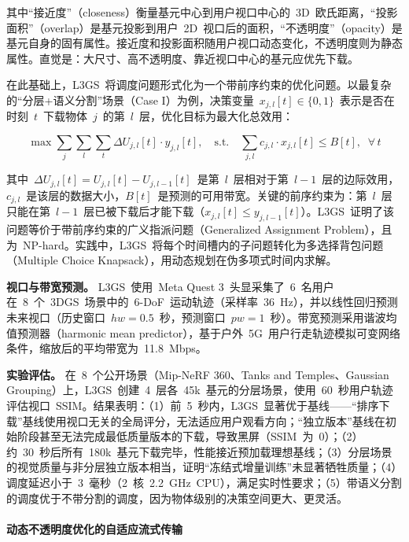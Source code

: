 其中``接近度''（closeness）衡量基元中心到用户视口中心的~3D~欧氏距离，``投影面积''（overlap）是基元投影到用户~2D~视口后的面积，``不透明度''（opacity）是基元自身的固有属性。接近度和投影面积随用户视口动态变化，不透明度则为静态属性。直觉是：大尺寸、高不透明度、靠近视口中心的基元应优先下载。

在此基础上，L3GS~将调度问题形式化为一个带前序约束的优化问题。以最复杂的``分层+语义分割''场景（Case I）为例，决策变量~$x_{j,l}[t] \in \{0,1\}$~表示是否在时刻~$t$~下载物体~$j$~的第~$l$~层，优化目标为最大化总效用：

\begin{equation}
\max \sum_{j} \sum_{l} \sum_{t} \Delta U_{j,l}[t] \cdot y_{j,l}[t], \quad \text{s.t.} \quad \sum_{j,l} c_{j,l} \cdot x_{j,l}[t] \leq B[t], \;\; \forall\, t
\end{equation}

其中~$\Delta U_{j,l}[t] = U_{j,l}[t] - U_{j,l-1}[t]$~是第~$l$~层相对于第~$l-1$~层的边际效用，$c_{j,l}$~是该层的数据大小，$B[t]$~是预测的可用带宽。关键的前序约束为：第~$l$~层只能在第~$l-1$~层已被下载后才能下载（$x_{j,l}[t] \leq y_{j,l-1}[t]$）。L3GS~证明了该问题等价于带前序约束的广义指派问题（Generalized Assignment Problem），且为~NP-hard。实践中，L3GS~将每个时间槽内的子问题转化为多选择背包问题（Multiple Choice Knapsack），用动态规划在伪多项式时间内求解。

\textbf{视口与带宽预测。}
L3GS~使用~Meta Quest 3~头显采集了~6~名用户在~8~个~3DGS~场景中的~6-DoF~运动轨迹（采样率~36~Hz），并以线性回归预测未来视口（历史窗口~$hw = 0.5$~秒，预测窗口~$pw = 1$~秒）。带宽预测采用谐波均值预测器（harmonic mean predictor），基于户外~5G~用户行走轨迹模拟可变网络条件，缩放后的平均带宽为~11.8~Mbps。

\textbf{实验评估。}
在~8~个公开场景（Mip-NeRF 360、Tanks and Temples、Gaussian Grouping）上，L3GS~创建~4~层各~45k~基元的分层场景，使用~60~秒用户轨迹评估视口~SSIM。结果表明：（1）前~5~秒内，L3GS~显著优于基线——``排序下载''基线使用视口无关的全局评分，无法适应用户观看方向；``独立版本''基线在初始阶段甚至无法完成最低质量版本的下载，导致黑屏（SSIM~为~0）；（2）约~30~秒后所有~180k~基元下载完毕，性能接近预加载理想基线；（3）分层场景的视觉质量与非分层独立版本相当，证明``冻结式增量训练''未显著牺牲质量；（4）调度延迟小于~3~毫秒（2~核~2.2~GHz~CPU），满足实时性要求；（5）带语义分割的调度优于不带分割的调度，因为物体级别的决策空间更大、更灵活。

\paragraph{动态不透明度优化的自适应流式传输}

